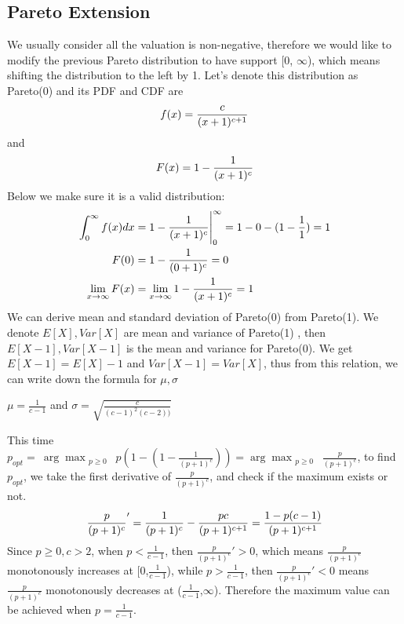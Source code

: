 \subsection{Pareto Extension}
We usually consider all the valuation is non-negative, therefore we would like to modify the previous Pareto distribution to have support [0,  $\infty$), which means shifting the distribution  to the left by 1. Let's denote this distribution as Pareto(0) and its PDF and CDF are
\begin{equation}\notag
f(x) = \frac{c}{(x+1)^{c+1}} 
\end{equation} 
and 
\begin{equation}\notag
F(x) = 1- \frac{1}{(x+1)^c}
\end{equation} 
Below we make sure it is a valid distribution:
\begin{align}\notag
	\int_{0}^{\infty} f(x) dx &= 1- \frac{1}{(x+1)^c} \Biggr|_{0}^{\infty}  = 1 - 0 -(1-\frac{1}{1}) = 1 \\ \notag  F(0) &= 1- \frac{1}{(0+1)^c} =0 \\ \notag  \lim_{x \to \infty} F(x) &= \lim_{x \to \infty} 1- \frac{1}{(x+1)^c} = 1
\end{align}
We can derive  mean and standard deviation of Pareto(0) from Pareto(1). We denote $E[X], Var[X]$ are mean and variance of Pareto(1) , then $E[X-1], Var[X-1]$ is the mean and variance for Pareto(0). We get $E[X-1] = E[X] - 1$ and $Var[X-1] = Var[X]$, thus from this relation, we can write down the formula for $\mu, \sigma$
\begin{center}
	$\mu = \frac{1}{c-1}$ \hspace{1cm} and \hspace{1cm}$\sigma = \sqrt{\frac{c}{(c-1)^2(c-2))}}$
\end{center}
This time $p_{opt} =\displaystyle\ \arg \max_{\substack{p \geqslant 0}} \  p(1 - (1-\frac{1}{(p+1)^c})) =\displaystyle\arg \max_{\substack{p \geqslant 0}} \  \frac{p}{(p+1)^c}$, to find $p_{opt}$, we take the first derivative of $\frac{p}{(p+1)^c}$, and check if the maximum exists or not.
\begin{equation}\notag
	\frac{p}{(p+1)^c}' = \frac{1}{(p+1)^c} - \frac{pc}{(p+1)^{c+1}} = \frac{1 - p(c-1)}{(p+1)^{c+1}}
\end{equation} 
Since $p \geqslant 0, c>2$, when $p < \frac{1}{c-1}$, then $\frac{p}{(p+1)^c}' > 0$, which means $\frac{p}{(p+1)^c}$ monotonously increases at [0,$\frac{1}{c-1}$), while $p > \frac{1}{c-1}$, then $\frac{p}{(p+1)^c}' < 0$ means $\frac{p}{(p+1)^c}$ monotonously decreases at ($\frac{1}{c-1}$,$\infty$). Therefore the maximum value can be achieved when $p = \frac{1}{c-1}$.

